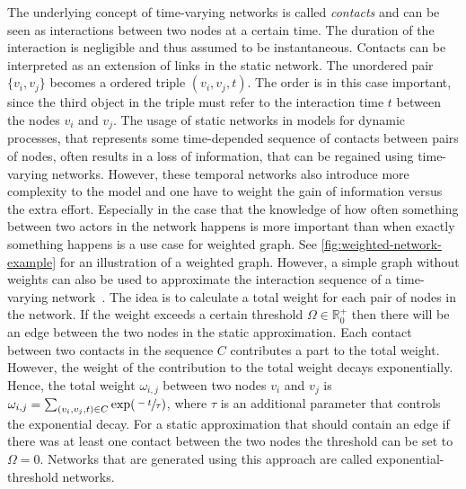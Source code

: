 The underlying concept of time-varying networks is called \emph{contacts} and can be seen as interactions between two nodes at a certain time.
The duration of the interaction is negligible and thus assumed to be instantaneous.
Contacts can be interpreted as an extension of links in the static network.
The unordered pair \(\{v_{i}, v_{j}\}\) becomes a ordered triple \((v_{i}, v_{j}, t)\).
The order is in this case important, since the third object in the triple must refer to the interaction time \(t\) between the nodes \(v_{i}\) and \(v_{j}\).
The usage of static networks in models for dynamic processes, that represents some time-depended sequence of contacts between pairs of nodes, often results in a loss of information, that can be regained using time-varying networks.
However, these temporal networks also introduce more complexity to the model and one have to weight the gain of information versus the extra effort.
Especially in the case that the knowledge of how often something between two actors in the network happens is more important than when exactly something happens is a use case for weighted graph.
See \autoref{fig:weighted-network-example} for an illustration of a weighted graph.
However, a simple graph without weights can also be used to approximate the interaction sequence of a time-varying network~\cite{Holme2013}.
The idea is to calculate a total weight for each pair of nodes in the network.
If the weight exceeds a certain threshold \(\Omega \in \mathbb{R}_{0}^{+}\) then there will be an edge between the two nodes in the static approximation.
Each contact between two contacts in the sequence \(C\) contributes a part to the total weight.
However, the weight of the contribution to the total weight decays exponentially.
Hence, the total weight \(\omega_{i,j}\) between two nodes \(v_{i}\) and \(v_{j}\) is \(\omega_{i,j} = \sum_{(v_{i}, v_{j}, t) \in C} \exp(\sfrac{-t}{\tau})\), where \(\tau\) is an additional parameter that controls the exponential decay.
For a static approximation that should contain an edge if there was at least one contact between the two nodes the threshold can be set to \(\Omega = 0\).
Networks that are generated using this approach are called exponential-threshold networks.

